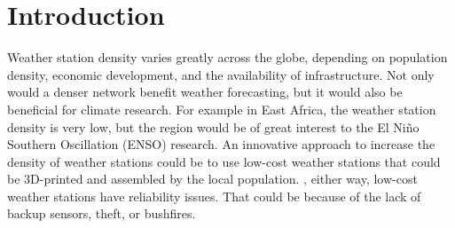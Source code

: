 \section{Introduction}
\label{sec:introduction}

Weather station density varies greatly across the globe, depending on population density,
economic development, and the availability of infrastructure. \cite{ortizbobea2021}
Not only would a denser network benefit weather forecasting, but it would also be beneficial
for climate research. For example in East Africa, the weather station density is very low,
but the region would be of great interest to the El Niño Southern Oscillation (ENSO)
research. \cite{marchant2007, muita2021}
An innovative approach to increase the density of weather stations could be to use
low-cost weather stations that could be 3D-printed and assembled by the local population.
\cite{muita2021}, either way, low-cost weather stations have reliability issues. That could
be because of the lack of backup sensors, theft, or bushfires.